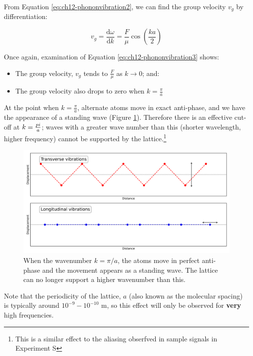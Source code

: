 \documentclass[
]{book}
\providecommand{\tightlist}{%
  \setlength{\itemsep}{0pt}\setlength{\parskip}{0pt}}
\begin{document}
From Equation \eqref{eq:ch12-phononvibration2}, we can find the group velocity \(v_g\) by differentiation:

\begin{equation}
v_g = \frac{\mathrm{d}\omega}{\mathrm{d}k} = \frac{F}{\mu} \cos \left(\frac{ka}{2}\right)
\label{eq:ch12-phononvibration3}
\end{equation}

Once again, examination of Equation \eqref{eq:ch12-phononvibration3} shows:

\begin{itemize}
\tightlist
\item
  The group velocity, \(v_g\) tends to \(\frac{F}{\mu}\) as \(k \rightarrow 0\); and:
\item
  The group velocity also drops to zero when \(k = \frac{\pi}{a}\)
\end{itemize}

At the point when \(k = \frac{\pi}{a}\), alternate atoms move in exact anti-phase, and we have the appearance of a standing wave (Figure \ref{fig:ch12-dispersionlattice1}). Therefore there is an effective cut-off at \(k = \frac{\\pi}{a}\); waves with a greater wave number than this (shorter wavelength, higher frequency) cannot be supported by the lattice.\footnote{This is a similar effect to the aliasing obserfved in sample signals in Experiment S}

\begin{figure}

{\centering \includegraphics[width=0.7\linewidth]{visualisations/ch12-phonons2} 

}

\caption{When the wavenumber $k = \pi / a$, the atoms move in perfect anti-phase and the movement appears as a standing wave. The lattice can no longer support a higher wavenumber than this.}\label{fig:ch12-dispersionlattice1}
\end{figure}

Note that the periodicity of the lattice, \(a\) (also known as the molecular spacing) is typically around \(10^{-9} - 10^{-10}\) m, so this effect will only be observed for \textbf{very} high frequencies.
\end{document}
